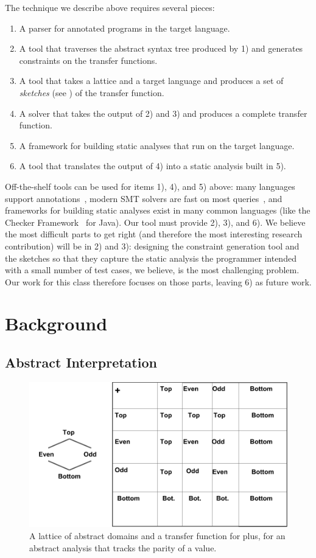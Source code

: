 \documentclass[10pt,conference]{IEEEtran}
\begin{document}
The technique we describe above requires several pieces:
\begin{enumerate}
\item A parser for annotated programs in the target language.
\item A tool that traverses the abstract syntax tree produced by 1) and
generates constraints on the transfer functions.
\item A tool that takes a lattice and a target language and produces
a set of \emph{sketches} (see ) of the transfer function.
\item A solver that takes the output of 2) and 3) and produces
a complete transfer function.
\item A framework for building static analyses that run on the target language.
\item A tool that translates the output of 4) into a static analysis built in
5).
\end{enumerate}

Off-the-shelf tools can be used for items 1), 4), and 5) above: many
languages support annotations~\cite{jsr308},
modern SMT solvers are fast on most queries~\cite{z3},
and frameworks for building static analyses exist in many common languages
(like the Checker Framework~\cite{checker-framework} for Java). Our tool
must provide 2), 3), and 6). We believe the most difficult parts to
get right (and therefore the most interesting research contribution)
will be in 2) and 3): designing the constraint generation tool and the
sketches so that they capture the static analysis the programmer intended
with a small number of test cases, we believe, is the most challenging
problem. Our work for this class therefore focuses on those parts,
leaving 6) as future work.

\section{Background}

\subsection{Abstract Interpretation}
\label{sec-ai}

\begin{figure}
 \includegraphics[width=\linewidth]{parity.png}
 \caption{A lattice of abstract domains and a transfer function
   for plus, for an abstract analysis that tracks the parity of
 a value.}
\label{fig-parity}
\end{figure} 
\end{document}
